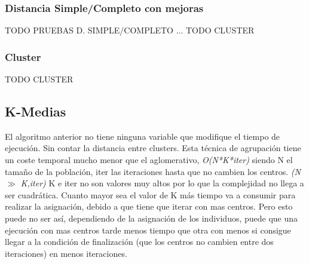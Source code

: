 			\newpage

		\subsubsection{Distancia Simple/Completo con mejoras}	
		
			\color{blue} TODO PRUEBAS D. SIMPLE/COMPLETO ...
			TODO CLUSTER
			\color{black}
		\subsubsection{Cluster}	
			
			\color{blue}
			TODO CLUSTER
			
			\color{black}
	
	
	
			\newpage

	\subsection{K-Medias}	

		El algoritmo anterior no tiene ninguna variable que modifique el tiempo de ejecución. Sin contar la distancia entre clusters. Esta técnica de agrupación tiene un coste temporal mucho menor que el aglomerativo, \textit{O(N*K*iter)} siendo N el tamaño de la población, iter las iteraciones  hasta que no cambien los centros. \textit{(N $\gg$ K,iter)} K e iter no son valores muy altos por lo que la complejidad no llega a ser cuadrática. Cuanto mayor sea el valor de K más tiempo va a consumir para realizar la asignación, debido a que tiene que iterar con mas centros. Pero esto puede no ser así, dependiendo de la asignación de los individuos, puede que una ejecución con mas centros tarde menos tiempo que otra con menos si consigue llegar a la condición de finalización (que los centros no cambien entre dos iteraciones) en menos iteraciones.
		
